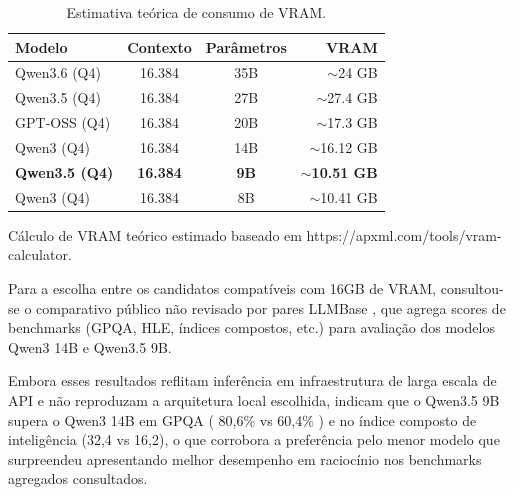 \documentclass[12pt]{article}
\begin{document}
\begin{table}[H]
  \centering
  \begin{threeparttable}
  \caption{Estimativa teórica de consumo de VRAM.}
  \label{tab:latency_compatibility}
  \footnotesize
  \begin{tabular}{l c c r}
    \toprule
    \textbf{Modelo}       & \textbf{Contexto} & \textbf{Parâmetros} & \textbf{VRAM}           \\
    \midrule
    Qwen3.6 (Q4)          & 16.384            & 35B                 & $\sim$24 GB             \\
    Qwen3.5 (Q4)          & 16.384            & 27B                 & $\sim$27.4 GB           \\
    GPT-OSS (Q4)          & 16.384            & 20B                 & $\sim$17.3 GB           \\
    Qwen3 (Q4)            & 16.384            & 14B                 & $\sim$16.12 GB          \\
    \textbf{Qwen3.5 (Q4)} & \textbf{16.384}   & \textbf{9B}         & \textbf{$\sim$10.51 GB} \\
    Qwen3 (Q4)            & 16.384            & 8B                  & $\sim$10.41 GB          \\
    \bottomrule
  \end{tabular}
  \begin{tablenotes}
    \footnotesize
    \item[*] Cálculo de VRAM teórico estimado baseado em https://apxml.com/tools/vram-calculator.
  \end{tablenotes}
  \end{threeparttable}
\end{table}

Para a escolha entre os candidatos compatíveis com 16GB de VRAM, consultou-se o comparativo público não revisado por pares LLMBase \cite{benchmarks_llm}, que agrega scores de benchmarks (GPQA, HLE, índices compostos, etc.) para avaliação dos modelos Qwen3 14B e Qwen3.5 9B.

Embora esses resultados reflitam inferência em infraestrutura de larga escala de API e não reproduzam a arquitetura local escolhida, indicam que o Qwen3.5 9B supera o Qwen3 14B em GPQA ( 80,6\% vs 60,4\% ) e no índice composto de inteligência (32,4 vs 16,2), o que corrobora a preferência pelo menor modelo que surpreendeu apresentando melhor desempenho em raciocínio nos benchmarks agregados consultados.
\end{document}
